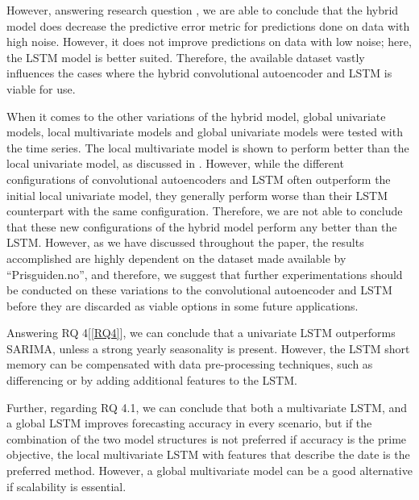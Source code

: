However, answering research question , we are able to conclude that the hybrid model does
decrease the predictive error metric for predictions done on data with high noise.
However, it does not improve predictions on data with low noise; here, the LSTM model is better suited.
Therefore, the available dataset vastly influences the cases where the hybrid convolutional autoencoder and LSTM is viable for use.

When it comes to the other variations of the hybrid model, global univariate models,
local multivariate models and global univariate models were tested with the time series.
The local multivariate model is shown to perform better than the local univariate model, as discussed in .
However, while the different configurations of convolutional autoencoders and LSTM often outperform the initial local univariate model,
they generally perform worse than their LSTM counterpart with the same configuration.
Therefore, we are not able to conclude that these new configurations of the hybrid model perform any better than the LSTM.
However, as we have discussed throughout the paper, the results accomplished are highly dependent on the dataset made available by ``Prisguiden.no'',
and therefore, we suggest that further experimentations should be conducted on these variations to the convolutional autoencoder and LSTM
before they are discarded as viable options in some future applications.



Answering RQ 4[\ref{RQ4}], we can conclude that a univariate LSTM outperforms SARIMA,
unless a strong yearly seasonality is present. However, the LSTM short memory can be
compensated with data pre-processing techniques, such as differencing or by adding
additional features to the LSTM.

Further, regarding RQ 4.1, we can conclude that both a multivariate LSTM,
and a global LSTM improves forecasting accuracy in every scenario, but if the combination
of the two model structures is not preferred if accuracy is the prime objective,
the local multivariate LSTM with features that describe the date is the preferred method.
However, a global multivariate model can be a good alternative if scalability is essential.

